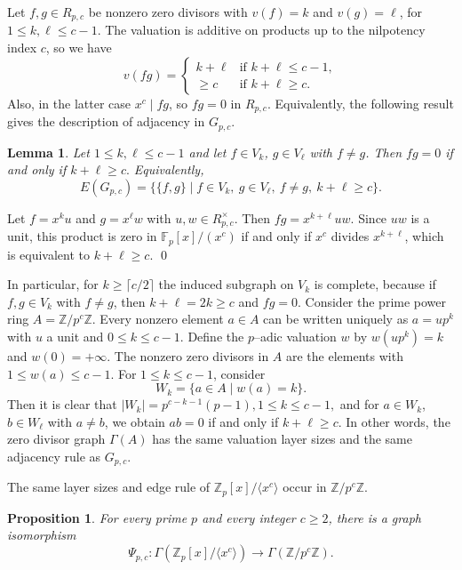 \documentclass[12pt]{article}
\newtheorem{lemma}[theorem]{Lemma}
\newtheorem{proposition}[theorem]{Proposition}
\theoremstyle{definition}
\renewenvironment{proof}{{\bf \noindent Proof.}}{\qed}
\begin{document}
\medskip
Let $f,g\in R_{p,c}$ be nonzero zero divisors with $v(f)=k$ and $v(g)=\ell$, for $1\le k,\ell\le c-1$.  The valuation is additive on	products up to the nilpotency index $c$, so we have
\[
v(fg) =
\begin{cases}
	k+\ell & \text{if }k+\ell\le c-1,\\
	\ge c  & \text{if }k+\ell\ge c.
\end{cases}
\]
Also, in the latter case $x^c\mid fg$, so $fg=0$ in $R_{p,c}$.  Equivalently,  the following result gives the description of adjacency in $G_{p,c}$.

\medskip

\begin{lemma}\label{lem:pc-adj-revised}
	Let $1\leq k,\ell\leq c-1$ and let $f\in V_k$, $g\in V_\ell$ with $f\neq g$.  Then
	$ fg=0$ if and only if $ k+\ell\geq c. $
	Equivalently,
	$$
	E(G_{p,c})=\bigl\{\{f,g\}\mid f\in V_k,\ g\in V_\ell,\ f\neq g,\ k+\ell\geq c\bigr\}.
	$$
\end{lemma}

\begin{proof}
	Let $f=x^k u$ and $g=x^\ell w$ with $u,w\in R_{p,c}^\times$.  Then
	$ fg=x^{k+\ell}uw. $
	Since $uw$ is a unit, this product is zero in $\mathbb F_p[x]/(x^c)$ if and only if $x^c$ divides $x^{k+\ell}$, which is equivalent to $k+\ell\geq c$.
\end{proof}

\medskip
In particular, for $k\ge\lceil c/2\rceil$ the induced subgraph on $V_k$ is
complete, because if $f,g\in V_k$ with $f\neq g$, then $k+\ell=2k\ge c$ and
$fg=0$. Consider the prime power ring $A=\mathbb Z/p^c\mathbb Z$.  Every nonzero element
$a\in A$ can be written uniquely as $a=u p^k$ with $u$ a unit and
$0\le k\le c-1$.  Define the $p$--adic valuation $w$ by $w(up^k)=k$ and
$w(0)=+\infty$.  The nonzero zero divisors in $A$ are the elements with
$1\le w(a)\le c-1$. For $1\le k\le c-1$, consider
\[
W_k = \{a\in A \mid w(a)=k\}.
\]
Then it is clear  that $|W_k| = p^{c-k-1}(p-1), 1\le k\le c-1,$ and for $a\in W_k$, $b\in W_\ell$ with $a\neq b$, we obtain $ab=0$  if and only if $k+\ell\ge c.$	In other words, the zero divisor graph $\Gamma(A)$ has the same valuation layer sizes and the same adjacency rule as $G_{p,c}$. 


\medskip

The same layer sizes and edge rule of $\mathbb{Z}_p[x]/\langle x^c\rangle$ occur in $\mathbb{Z}/p^c\mathbb{Z}$.

\medskip

\begin{proposition}\label{prop:pc-iso-revised}
	For every prime $p$ and every integer $c\geq 2$, there is a graph isomorphism
	$$
	\Psi_{p,c}:\Gamma(\mathbb{Z}_p[x]/\langle x^c\rangle)\longrightarrow \Gamma(\mathbb{Z}/p^c\mathbb{Z}).
	$$
\end{proposition}
\end{document}
